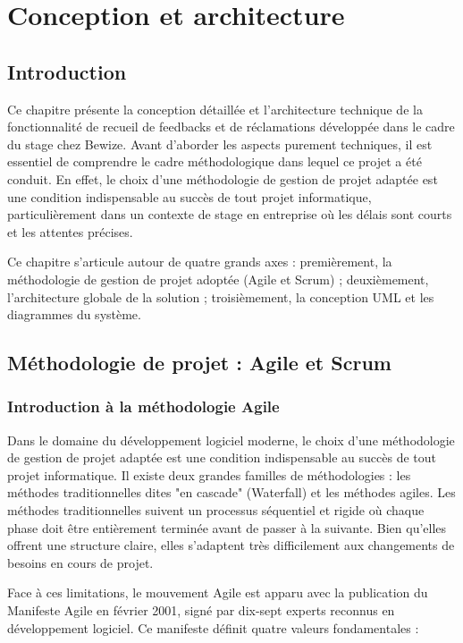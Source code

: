 \chapter{Conception et architecture}

\section{Introduction}
Ce chapitre présente la conception détaillée et l'architecture technique 
de la fonctionnalité de recueil de feedbacks et de réclamations développée 
dans le cadre du stage chez Bewize. Avant d'aborder les aspects purement 
techniques, il est essentiel de comprendre le cadre méthodologique dans 
lequel ce projet a été conduit. En effet, le choix d'une méthodologie de 
gestion de projet adaptée est une condition indispensable au succès de tout 
projet informatique, particulièrement dans un contexte de stage en entreprise 
où les délais sont courts et les attentes précises.

Ce chapitre s'articule autour de quatre grands axes : premièrement, la 
méthodologie de gestion de projet adoptée (Agile et Scrum) ; deuxièmement, 
l'architecture globale de la solution ; troisièmement, la conception UML 
et les diagrammes du système.

\section{Méthodologie de projet : Agile et Scrum}

\subsection{Introduction à la méthodologie Agile}
Dans le domaine du développement logiciel moderne, le choix d'une 
méthodologie de gestion de projet adaptée est une condition indispensable 
au succès de tout projet informatique. Il existe deux grandes familles 
de méthodologies : les méthodes traditionnelles dites "en cascade" 
(Waterfall) et les méthodes agiles. Les méthodes traditionnelles suivent 
un processus séquentiel et rigide où chaque phase doit être entièrement 
terminée avant de passer à la suivante. Bien qu'elles offrent une structure 
claire, elles s'adaptent très difficilement aux changements de besoins 
en cours de projet.

Face à ces limitations, le mouvement Agile est apparu avec la publication 
du Manifeste Agile en février 2001, signé par dix-sept experts reconnus 
en développement logiciel. Ce manifeste définit quatre valeurs fondamentales :

